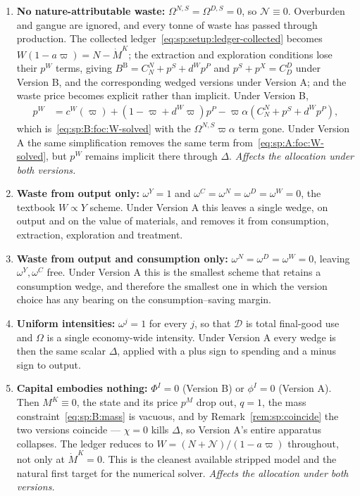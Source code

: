 \begin{enumerate}[label=\textbf{(W\arabic*)},ref=W\arabic*,leftmargin=3.2em,itemsep=0.35em]

\item\label{sw:sp:nature} \textbf{No nature-attributable waste:} $\Omega^{N,S}=\Omega^{D,S}=0$, so
$\mathcal N\equiv0$. Overburden and gangue are ignored, and every tonne of waste has passed through
production. The collected ledger~\eqref{eq:sp:setup:ledger-collected} becomes
$W\left(1-a\varpi\right)=N-\dot M^K$; the extraction and exploration conditions lose their $p^W$ terms,
giving $B^{\mathrm B}=C^N_N+p^S+d^Wp^P$ and $p^S+p^X=C^D_D$ under Version B, and the corresponding wedged versions
under Version A; and the waste price becomes explicit rather than implicit. Under Version B,
\begin{align}
p^W &= c^W\!\left(\varpi\right)+\left(1-\varpi+d^W\varpi\right)p^P
-\varpi\alpha\left(C^N_N+p^S+d^Wp^P\right),
\label{eq:sp:schemes:pW-simple}
\end{align}
which is~\eqref{eq:sp:B:foc:W-solved} with the $\Omega^{N,S}\varpi\alpha$ term gone. Under Version A the
same simplification removes the same term from~\eqref{eq:sp:A:foc:W-solved}, but $p^W$ remains implicit
there through $\Delta$. \emph{Affects the allocation under both versions.}

\item\label{sw:sp:omegaY} \textbf{Waste from output only:} $\omega^Y=1$ and
$\omega^C=\omega^{N}=\omega^{D}=\omega^W=0$, the textbook $W\propto Y$ scheme. Under Version A this
leaves a single wedge, on output and on the value of materials, and removes it from consumption,
extraction, exploration and treatment.

\item\label{sw:sp:omegaYC} \textbf{Waste from output and consumption only:}
$\omega^{N}=\omega^{D}=\omega^W=0$, leaving $\omega^Y,\omega^C$ free. Under Version A this is the
smallest scheme that retains a consumption wedge, and therefore the smallest one in which the
version choice has any bearing on the consumption--saving margin.

\item\label{sw:sp:uniform} \textbf{Uniform intensities:} $\omega^j=1$ for every $j$, so that
$\mathcal D$ is total final-good use and $\Omega$ is a single economy-wide intensity. Under Version A
every wedge is then the same scalar $\Delta$, applied with a plus sign to spending and a minus sign to
output.

\item\label{sw:sp:phiI} \textbf{Capital embodies nothing:} $\Phi^I=0$ (Version B) or $\phi^I=0$
(Version A). Then $M^K\equiv0$, the state and its price $p^M$ drop out, $q=1$, the mass
constraint~\eqref{eq:sp:B:mass} is vacuous, and by Remark~\ref{rem:sp:coincide} the two versions
coincide --- $\chi=0$ kills $\Delta$, so Version A's entire apparatus collapses. The ledger reduces to
$W=\left(N+\mathcal N\right)/\left(1-a\varpi\right)$ throughout, not only at $\dot M^K=0$. This is the
cleanest available stripped model and the natural first target for the numerical solver.
\emph{Affects the allocation under both versions.}


\end{enumerate}
